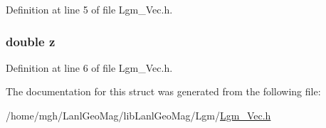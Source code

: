 Definition at line 5 of file Lgm\_\-Vec.h.\hypertarget{struct_lgm___vector_b3e6ed577a7c669c19de1f9c1b46c872}{
\subsubsection[{z}]{\setlength{\rightskip}{0pt plus 5cm}double {\bf z}}}
\label{struct_lgm___vector_b3e6ed577a7c669c19de1f9c1b46c872}




Definition at line 6 of file Lgm\_\-Vec.h.

The documentation for this struct was generated from the following file:\begin{CompactItemize}
\item 
/home/mgh/LanlGeoMag/libLanlGeoMag/Lgm/\hyperlink{_lgm___vec_8h}{Lgm\_\-Vec.h}\end{CompactItemize}

